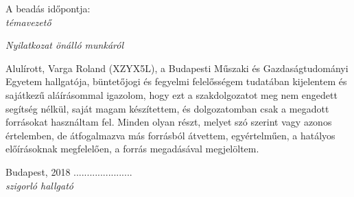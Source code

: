 A beadás időpontja: \\[1cm]

{\hspace{0.62\textwidth} \itshape témavezető}\\[0.1cm]

{\centering \itshape Nyilatkozat önálló munkáról \par}
Alulírott, Varga Roland (XZYX5L), a Budapesti Műszaki és Gazdaságtudományi Egyetem hallgatója, büntetőjogi és fegyelmi felelősségem tudatában kijelentem és sajátkezű aláírásommal igazolom, hogy ezt a szakdolgozatot meg nem engedett segítség nélkül, saját magam készítettem, és dolgozatomban csak a megadott forrásokat használtam fel. Minden olyan részt, melyet szó szerint vagy azonos értelemben, de átfogalmazva más forrásból átvettem, egyértelműen, a hatályos előírásoknak megfelelően, a forrás megadásával megjelöltem.

{Budapest, 2018 ......................}\\[1cm]

{\hspace{0.6\textwidth} \itshape szigorló hallgató}